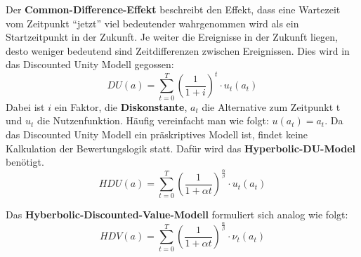 Der \textbf{Common-Difference-Effekt} beschreibt den Effekt, dass
eine Wartezeit vom Zeitpunkt ``jetzt'' viel bedeutender wahrgenommen wird
als ein Startzeitpunkt in der Zukunft. Je weiter die Ereignisse in der Zukunft
liegen, desto weniger bedeutend sind Zeitdifferenzen zwischen Ereignissen.
Dies wird in das Discounted Unity Modell gegossen:
\begin{equation}
        DU(a) = \sum_{t=0}^T (\frac{1}{1+i})^t \cdot u_t(a_t)
\end{equation}
Dabei ist $i$ ein Faktor, die \textbf{Diskonstante}, $a_t$ die Alternative
zum Zeitpunkt t und $u_t$ die Nutzenfunktion. Häufig vereinfacht man wie folgt:
$u(a_t) = a_t$. Da das Discounted Unity Modell ein präskriptives Modell ist,
findet keine Kalkulation der Bewertungslogik statt. Dafür wird das
\textbf{Hyperbolic-DU-Model} benötigt.
\begin{equation}
    HDU(a) = \sum_{t=0}^T (\frac{1}{1+\alpha t})^{\frac{\alpha}{\beta}} \cdot u_t(a_t)
\end{equation}

Das \textbf{Hyberbolic-Discounted-Value-Modell} formuliert sich analog wie folgt:
\begin{equation}
    HDV(a) = \sum_{t=0}^T (\frac{1}{1+\alpha t})^{\frac{\alpha}{\beta}} \cdot \nu_t(a_t)
\end{equation}
